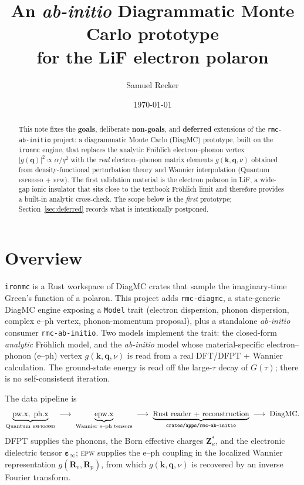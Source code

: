 \documentclass[11pt]{article}
\title{An \emph{ab-initio} Diagrammatic Monte Carlo prototype\\
       for the LiF electron polaron}
\author{Samuel Recker}
\date{\today}
\newcommand{\kv}{\mathbf{k}}
\newcommand{\qv}{\mathbf{q}}
\newcommand{\Rv}{\mathbf{R}}
\newcommand{\Zst}{\mathbf{Z}^{*}}
\newcommand{\epsinf}{\bm{\varepsilon}_{\infty}}
\begin{document}
\maketitle

\begin{abstract}
This note fixes the \textbf{goals}, deliberate \textbf{non-goals}, and
\textbf{deferred} extensions of the \texttt{rmc-ab-initio} project: a diagrammatic
Monte Carlo (DiagMC) prototype, built on the \texttt{ironmc} engine, that replaces the
analytic Fr\"ohlich electron--phonon vertex $|g(\qv)|^{2}\propto\alpha/q^{2}$ with the
\emph{real} electron--phonon matrix elements $g(\kv,\qv,\nu)$ obtained from
density-functional perturbation theory and Wannier interpolation (Quantum \textsc{espresso}
$+$ \textsc{epw}). The first validation material is the electron polaron in LiF, a
wide-gap ionic insulator that sits close to the textbook Fr\"ohlich limit and therefore
provides a built-in analytic cross-check. The scope below is the \emph{first} prototype;
Section~\ref{sec:deferred} records what is intentionally postponed.
\end{abstract}

\section{Overview}
\label{sec:overview}

\texttt{ironmc} is a Rust workspace of DiagMC crates that sample the imaginary-time
Green's function of a polaron. This project adds \texttt{rmc-diagmc}, a state-generic DiagMC
engine exposing a \texttt{Model} trait (electron dispersion, phonon dispersion, complex e--ph
vertex, phonon-momentum proposal), plus a standalone \emph{ab-initio} consumer
\texttt{rmc-ab-initio}. Two models implement the trait: the closed-form \emph{analytic}
Fr\"ohlich model, and the \emph{ab-initio} model whose material-specific electron--phonon
(e--ph) vertex $g(\kv,\qv,\nu)$ is read from a real DFT/DFPT + Wannier calculation. The
ground-state energy is read off the large-$\tau$ decay of $G(\tau)$; there is no
self-consistent iteration.

The data pipeline is
\[
  \underbrace{\text{pw.x},\ \text{ph.x}}_{\text{Quantum \textsc{espresso}}}
  \;\longrightarrow\;
  \underbrace{\text{epw.x}}_{\text{Wannier e--ph tensors}}
  \;\longrightarrow\;
  \underbrace{\text{Rust reader + reconstruction}}_{\texttt{crates/apps/rmc-ab-initio}}
  \;\longrightarrow\;
  \text{DiagMC}.
\]
DFPT supplies the phonons, the Born effective charges $\Zst_{\kappa}$, and the electronic
dielectric tensor $\epsinf$; \textsc{epw} supplies the e--ph coupling in the localized
Wannier representation $g(\Rv_{e},\Rv_{p})$, from which $g(\kv,\qv,\nu)$ is recovered by an
inverse Fourier transform.
\end{document}
